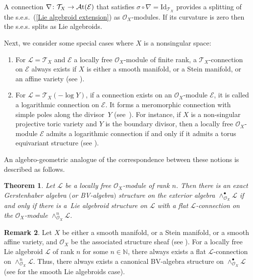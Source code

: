 \documentclass[pdftex]{sigma}
\numberwithin{equation}{section}
\newtheorem{Thm}{Theorem}[section]
\theoremstyle{definition}
\newtheorem{Rem}[Thm]{Remark}
\begin{document}
A connection $\nabla\colon \mathcal{T}_X \rightarrow \mathcal{A}{\rm t}(\mathcal{E})$ that satisfies $\sigma \circ \nabla=\mathrm{Id}_{\mathcal{T}_X}$ provides a splitting of the s.e.s.\ (\ref{Lie algebroid extension}) as $\mathcal{O}_X$-modules. If its curvature is zero then the s.e.s. splits as Lie algebroids.

Next, we consider some special cases where $X$ is a nonsingular space:
\begin{enumerate}\itemsep=0pt
\item[$(i)$] For $\mathcal{L}=\mathcal{T}_X$ and $\mathcal{E}$ a locally free $\mathcal{O}_X$-module of finite rank, a $\mathcal{T}_X$-connection on $\mathcal{E}$ always exists if $X$ is either a smooth manifold, or a Stein manifold, or an affine variety (see \cite{MA}).
\item[$(ii)$] For $\mathcal{L}=\mathcal{T}_X(- \log Y)$, if a connection exists on an $\mathcal{O}_X$-module $\mathcal{E}$, it is called a logarithmic connection on $\mathcal{E}$. It forms a meromorphic connection with simple poles along the divisor~$Y$ (see~\cite{CMD,BP}). For instance, if $X$ is a non-singular projective toric variety and $Y$ is the boundary divisor, then a locally free $\mathcal{O}_X$-module $\mathcal{E}$ admits a logarithmic connection if and only if it admits a torus equivariant structure (see \cite{IBMP, IB}).
\end{enumerate}

An algebro-geometric analogue of the correspondence between these notions \cite{PX} is described as follows.
\begin{Thm} \label{BV-alg & flat conn}
	Let $\mathcal{L}$ be a locally free $\mathcal{O}_X$-module of rank $n$. Then there is an exact Gerstenhaber algebra $($or BV-algebra$)$ structure on the exterior algebra $\wedge^{\bullet}_{\mathcal{O}_X}\mathcal{L}$ if and only if there is a~Lie algebroid structure on $\mathcal{L}$ with a flat $\mathcal{L}$-connection on the $\mathcal{O}_X$-module $\wedge^{n}_{\mathcal{O}_X}\mathcal{L}$.
\end{Thm}
\begin{Rem}\label{canonical BV-alg}
	Let $X$ be either a smooth manifold, or a Stein manifold, or a smooth affine variety, and $\mathcal{O}_X$ be the associated structure sheaf (see \cite{MA, FF}).
	For a locally free Lie algebroid $\mathcal{L}$ of rank $n$ for some $n \in \mathbb{N}$, there always exists a flat $\mathcal{L}$-connection on $\wedge^{n}_{\mathcal{O}_X}\mathcal{L}$. Thus, there always exists a canonical BV-algebra structure on $\wedge^{\bullet}_{\mathcal{O}_X}\mathcal{L}$ (see \cite{PX} for the smooth Lie algebroids case).
\end{Rem}
\end{document}
